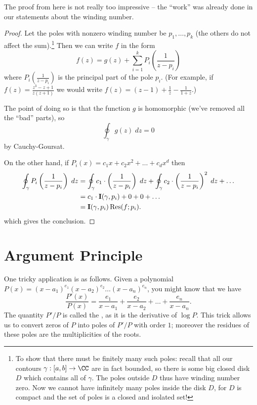 The proof from here is not really too impressive -- the ``work'' was already
done in our statements about the winding number.
\begin{proof}
	Let the poles with nonzero winding number be $p_1, \dots, p_k$ (the others do not affect the sum).\footnote{
		To show that there must be finitely many such poles: recall that all our contours $\gamma : [a,b] \to \CC$
		are in fact bounded, so there is some big closed disk $D$ which contains all of $\gamma$.
		The poles outside $D$ thus have winding number zero.
		Now we cannot have infinitely many poles inside the disk $D$, for $D$ is compact and the
		set of poles is a closed and isolated set!}
	Then we can write $f$ in the form
	\[
		f(z) = g(z) + \sum_{i=1}^k P_i\left( \frac{1}{z-p_i} \right)
	\]
	where $P_i\left( \frac{1}{z-p_i} \right)$ is the principal part of the pole $p_i$.
	(For example, if $f(z) = \frac{z^3-z+1}{z(z+1)}$ we would write $f(z) = (z-1) + \frac1z - \frac1{1+z}$.)

	The point of doing so is that the function $g$ is homomorphic (we've removed all the ``bad'' parts), so 
	\[ \oint_{\gamma} g(z) \; dz = 0 \]
	by Cauchy-Goursat.

	On the other hand, if $P_i(x) = c_1x + c_2x^2 + \dots + c_d x^d$ then
	\begin{align*}
		\oint_{\gamma} P_i\left( \frac{1}{z-p_i} \right) \; dz
		&=
		\oint_{\gamma} c_1 \cdot \left( \frac{1}{z-p_i} \right) \; dz
		+ \oint_{\gamma} c_2 \cdot \left( \frac{1}{z-p_i} \right)^2 \; dz
		+ \dots \\
		&= c_1 \cdot \operatorname{\mathbf I}(\gamma, p_i) + 0 + 0 + \dots \\
		&= \operatorname{\mathbf I}(\gamma, p_i) \operatorname{Res}(f; p_i).
	\end{align*}
	which gives the conclusion.
\end{proof}

\section{Argument Principle}
One tricky application is as follows.
Given a polynomial $P(x) = (x-a_1)^{e_1}(x-a_2)^{e_2}\dots(x-a_n)^{e_n}$, you might know that we have
\[ \frac{P'(x)}{P(x)} = \frac{e_1}{x-a_1} + \frac{e_2}{x-a_2} + \dots + \frac{e_n}{x-a_n}. \]
The quantity $P'/P$ is called the , as it is the derivative of $\log P$.
This trick allows us to convert zeros of $P$ into poles of $P'/P$ with order $1$;
moreover the residues of these poles are the multiplicities of the roots.

